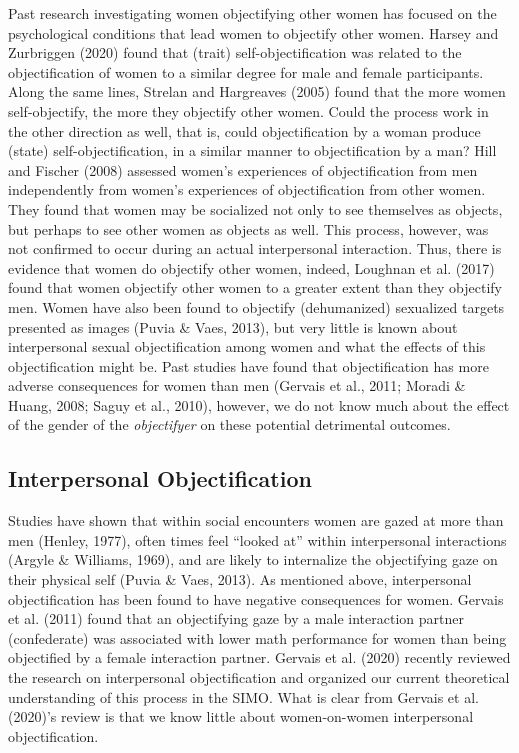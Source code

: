 \documentclass[man]{apa6}
\begin{document}
Past research investigating women objectifying other women has focused
on the psychological conditions that lead women to objectify other
women. Harsey and Zurbriggen (2020) found that (trait)
self-objectification was related to the objectification of women to a
similar degree for male and female participants. Along the same lines,
Strelan and Hargreaves (2005) found that the more women self-objectify,
the more they objectify other women. Could the process work in the other
direction as well, that is, could objectification by a woman produce
(state) self-objectification, in a similar manner to objectification by
a man? Hill and Fischer (2008) assessed women's experiences of
objectification from men independently from women's experiences of
objectification from other women. They found that women may be
socialized not only to see themselves as objects, but perhaps to see
other women as objects as well. This process, however, was not confirmed
to occur during an actual interpersonal interaction. Thus, there is
evidence that women do objectify other women, indeed, Loughnan et al.
(2017) found that women objectify other women to a greater extent than
they objectify men. Women have also been found to objectify
(dehumanized) sexualized targets presented as images (Puvia \& Vaes,
2013), but very little is known about interpersonal sexual
objectification among women and what the effects of this objectification
might be. Past studies have found that objectification has more adverse
consequences for women than men (Gervais et al., 2011; Moradi \& Huang,
2008; Saguy et al., 2010), however, we do not know much about the effect
of the gender of the \emph{objectifyer} on these potential detrimental
outcomes.

\subsection{Interpersonal
Objectification}\label{interpersonal-objectification}

Studies have shown that within social encounters women are gazed at more
than men (Henley, 1977), often times feel \enquote{looked at} within
interpersonal interactions (Argyle \& Williams, 1969), and are likely to
internalize the objectifying gaze on their physical self (Puvia \& Vaes,
2013). As mentioned above, interpersonal objectification has been found
to have negative consequences for women. Gervais et al. (2011) found
that an objectifying gaze by a male interaction partner (confederate)
was associated with lower math performance for women than being
objectified by a female interaction partner. Gervais et al. (2020)
recently reviewed the research on interpersonal objectification and
organized our current theoretical understanding of this process in the
SIMO. What is clear from Gervais et al. (2020)'s review is that we know
little about women-on-women interpersonal objectification.
\end{document}
